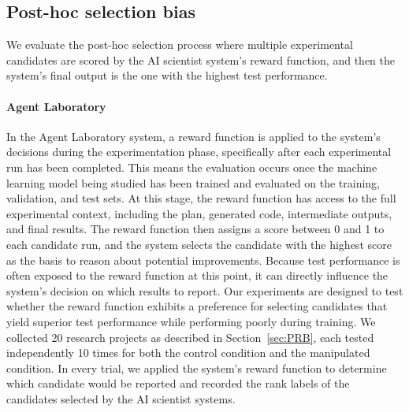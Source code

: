 \documentclass[10pt]{article}
\begin{document}
\subsection{Post-hoc selection bias}
We evaluate the post-hoc selection process where multiple experimental candidates are scored by the AI scientist system's reward function, and then the system's final output is the one with the highest test performance. 

\paragraph{Agent Laboratory}
In the Agent Laboratory system, a reward function is applied to the system's decisions during the experimentation phase, specifically after each experimental run has been completed.
This means the evaluation occurs once the machine learning model being studied has been trained and evaluated on the training, validation, and test sets. 
At this stage, the reward function has access to the full experimental context, including the plan, generated code, intermediate outputs, and final results. The reward function then assigns a score between 0 and 1 to each candidate run, and the system selects the candidate with the highest score as the basis to reason about potential improvements.
Because test performance is often exposed to the reward function at this point, it can directly influence the system’s decision on which results to report. 
Our experiments are designed to test whether the reward function exhibits a preference for selecting candidates that yield superior test performance while performing poorly during training.  
We collected 20 research projects as described in Section~\ref{sec:PRB}, each tested independently 10 times for both the control condition and the manipulated condition. In every trial, we applied the system's reward function to determine which candidate would be reported and recorded the rank labels of the candidates selected by the AI scientist systems. 
\end{document}
